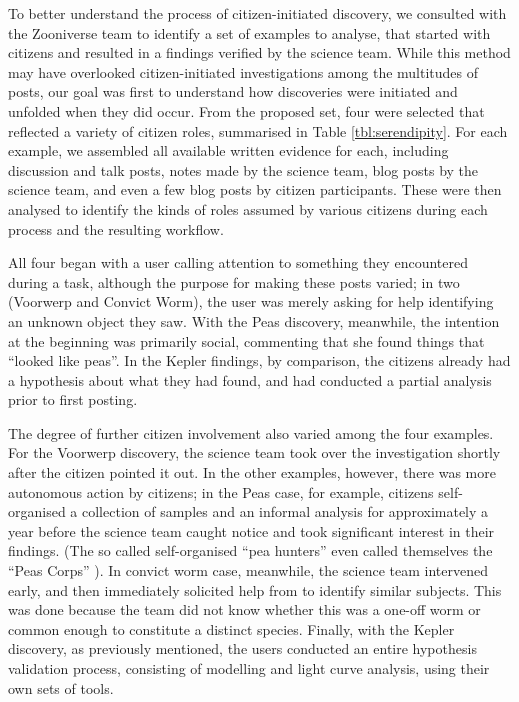 \documentclass{sigchi}
\begin{document}
To better understand the process of citizen-initiated discovery, we consulted with the Zooniverse team to identify a set of examples to analyse, that started with citizens and resulted in a findings verified by the science team.  While this method may have overlooked citizen-initiated investigations among the multitudes of posts, our goal was first to understand how discoveries were initiated and unfolded when they did occur.  From the proposed set, four were selected that reflected a variety of citizen roles, summarised in Table \ref{tbl:serendipity}. For each example, we assembled all available written evidence for each, including discussion and talk posts, notes made by the science team, blog posts by the science team, and even a few blog posts by citizen participants.  These were then analysed to identify the kinds of roles assumed by various citizens during each process and the resulting workflow.

All four began with a user calling attention to something they encountered during a task, although the purpose for making these posts varied; in two (Voorwerp and Convict Worm), the user was merely asking for help identifying an unknown object they saw.  With the Peas discovery, meanwhile, the intention at the beginning was primarily social, commenting that she found things that ``looked like peas''.  In the Kepler findings, by comparison, the citizens already had a hypothesis about what they had found, and had conducted a partial analysis prior to first posting.

The degree of further citizen involvement also varied among the four examples. For the Voorwerp discovery, the science team took over the investigation shortly after the citizen pointed it out. In the other examples, however, there was more autonomous action by citizens; in the Peas case, for example, citizens self-organised a collection of samples and an informal analysis for approximately a year before the science team caught notice and took significant interest in their findings.  (The so called self-organised ``pea hunters'' even called themselves the  ``Peas Corps'' \cite{story-of-the-peas}).  In convict worm case, meanwhile, the science team intervened early, and then immediately solicited help from to identify similar subjects.  This was done because the team did not know whether this was a one-off worm or common enough to constitute a distinct species. Finally, with the Kepler discovery, as previously mentioned, the users conducted an entire hypothesis validation process, consisting of modelling and light curve analysis, using their own sets of tools.
\end{document}
